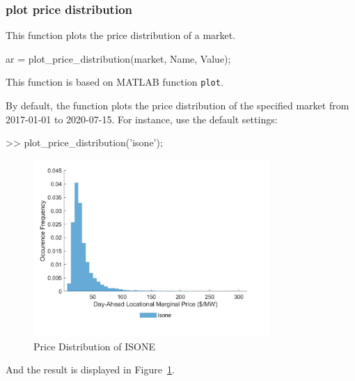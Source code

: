 \documentclass[11pt]{article}
\newcommand{\matlab}{\textsc{MATLAB}}
\numberwithin{equation}{section}
\numberwithin{table}{section}
\numberwithin{figure}{section}
\begin{document}
\subsubsection{plot price distribution}

This function plots the price distribution of a market. 

\begin{Code}
  ar = plot_price_distribution(market, Name, Value);
\end{Code}

This function is based on \matlab{} function \verb!plot!.

By default, the function plots the price distribution of the specified market from 2017-01-01 to 2020-07-15. For instance, use the default settings:

\begin{Code}
  >> plot_price_distribution('isone');
\end{Code}

\begin{figure}
  \centering
  \noindent\includegraphics[width=0.8\textwidth]{figures/visualization_example1.jpg}
  \caption{Price Distribution of ISONE} \label{fig:vis_1}
\end{figure}

And the result is displayed in Figure~\ref{fig:vis_1}. 
\end{document}
